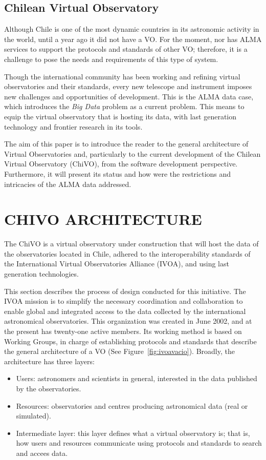 \documentclass[]{spie}
\begin{document}
\subsection{Chilean Virtual Observatory}
\label{sec:chivo}
Although Chile is one of the most dynamic countries in its astronomic activity
in the world, until a year ago it did not have a VO.  For the moment, nor has
ALMA services to support the protocols and standards of other VO; therefore, it
is a challenge to pose the needs and requirements of this type of system.

Though the international community has been working and refining virtual
observatories and their standards, every new telescope and instrument imposes
new challenges and opportunities of development.  This is the ALMA data case,
which introduces the \emph{Big Data} problem as a current problem.  This means to
equip the virtual observatory that is hosting its data, with last generation
technology and frontier research in its tools.

The aim of this paper is to introduce the reader to the general architecture of
Virtual Observatories and, particularly to the current development of the
Chilean Virtual Observatory (ChiVO), from the software development perspective.
Furthermore, it will present its status and how were the restrictions and
intricacies of the ALMA data addressed.

\section{CHIVO ARCHITECTURE} 
The ChiVO is a virtual observatory under construction that will host the data of the observatories located in Chile, adhered to the interoperability standards of the International Virtual Observatories Alliance (IVOA), and using last generation technologies. 

This section describes the process of design conducted for this initiative.
The IVOA mission is to simplify the necessary coordination and collaboration to enable global and integrated access to the data collected by the international astronomical observatories. This organization was created in June 2002, and at the present has twenty-one active members.  Its working method is based on Working Groups, in charge of establishing protocols and standards that describe the general architecture of a VO (See Figure~\ref{fig:ivoavacio}).  Broadly, the architecture has three layers:
\begin{itemize}
    \item Users:  astronomers and scientists in general, interested in 
        the data published by the observatories.
    \item Resources: observatories and centres producing astronomical 
        data (real or simulated).
    \item Intermediate layer:  this layer defines what a virtual observatory 
        is; that is, how users and resources communicate using protocols and 
        standards to search and accees data.
\end{itemize}
\end{document}
